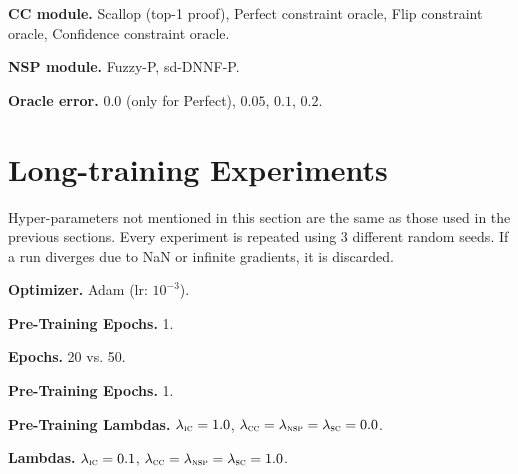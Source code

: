 \noindent\textbf{\textsc{CC} module.} Scallop (top-1 proof), Perfect constraint oracle, Flip constraint oracle, Confidence constraint oracle.

\noindent\textbf{\textsc{NSP} module.} Fuzzy-P, sd-DNNF-P.

\noindent\textbf{Oracle error.} $0.0$ (only for Perfect), $0.05$, $0.1$, $0.2$.




\section{Long-training Experiments}\label{app:seqhyper}
Hyper-parameters not mentioned in this section are the same as those used in the previous sections.
Every experiment is repeated using 3 different random seeds. If a run diverges due to NaN or infinite gradients, it is discarded.

\noindent\textbf{Optimizer.} Adam (lr: $10^{-3}$).

\noindent\textbf{Pre-Training Epochs.} 1.

\noindent\textbf{Epochs.} 20 vs. 50.

\noindent\textbf{Pre-Training Epochs.} 1.

\noindent\textbf{Pre-Training Lambdas.} $\lambda_{\textsc{ic}} = 1.0$, $\lambda_{\textsc{cc}} = \lambda_{\textsc{nsp}} = \lambda_{\textsc{sc}} = 0.0$.

\noindent\textbf{Lambdas.} $\lambda_{\textsc{ic}} = 0.1$, $\lambda_{\textsc{cc}} = \lambda_{\textsc{nsp}} = \lambda_{\textsc{sc}} = 1.0$.


